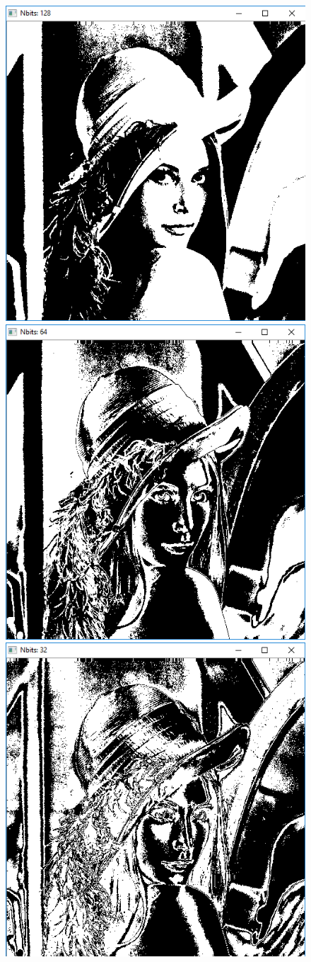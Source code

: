 \documentclass[12pt,a4paper]{article}
\begin{document}
\begin{figure}[h] 
\centering
  \begin{minipage}{0.4\linewidth}
    \centering
    \includegraphics[width=.6\linewidth]{128} 
  \end{minipage}
  \begin{minipage}{0.4\linewidth}
    \centering
    \includegraphics[width=.6\linewidth]{64} 
  \end{minipage} 
  \begin{minipage}{0.4\linewidth}
    \centering
    \includegraphics[width=.6\linewidth]{32} 

\end{minipage}
\end{figure}
\end{document}
